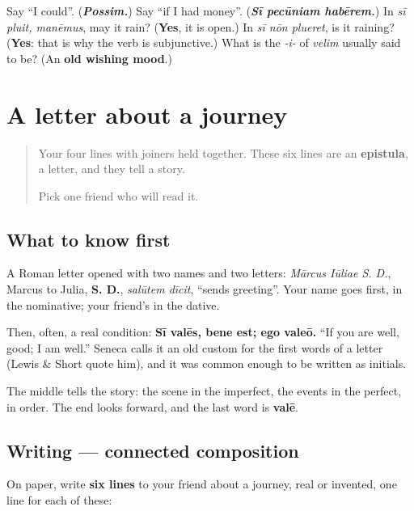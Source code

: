 \begin{tcolorbox}[breakable,colback=teal!4,colframe=teal!35!black,title={Before you move on}]
Say \textquotedblleft{}I could\textquotedblright{}. (\emph{\textbf{Possim.}}) Say \textquotedblleft{}if I had money\textquotedblright{}. (\emph{\textbf{Sī pecūniam habērem.}}) In \emph{sī pluit, manēmus}, may it rain? (\textbf{Yes}, it is open.) In \emph{sī nōn plueret}, is it raining? (\textbf{Yes}: that is why the verb is subjunctive.) What is the \emph{-i-} of \emph{velim} usually said to be? (An \textbf{old wishing mood}.)
\end{tcolorbox}
\section[(epistula)]{A letter about a journey}

\label{lesson:LA-W290-epistula}



\begin{quote}
Your four lines with joiners held together. These six lines are an \textbf{epistula}, a letter, and they tell a story.

Pick one friend who will read it.
\end{quote}

\subsection*{What to know first}
A Roman letter opened with two names and two letters: \emph{Mārcus Iūliae S. D.}, Marcus to Julia, \textbf{S. D.}, \emph{salūtem dīcit}, \textquotedblleft{}sends greeting\textquotedblright{}. Your name goes first, in the nominative; your friend's in the dative.

Then, often, a real condition: \textbf{Sī valēs, bene est; ego valeō.} \textquotedblleft{}If you are well, good; I am well.\textquotedblright{} Seneca calls it an old custom for the first words of a letter (Lewis \& Short quote him), and it was common enough to be written as initials.

The middle tells the story: the scene in the imperfect, the events in the perfect, in order. The end looks forward, and the last word is \textbf{valē}.

\subsection*{Writing — connected composition}
On paper, write \textbf{six lines} to your friend about a journey, real or invented, one line for each of these:

